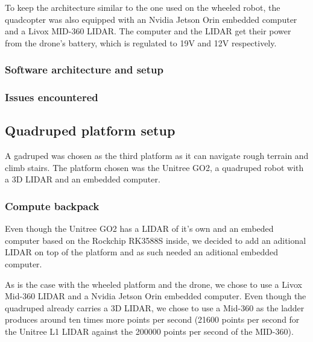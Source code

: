 \documentclass[11pt]{article}
\begin{document}
                To keep the architecture similar to the one used on the wheeled robot, the quadcopter was also equipped with an Nvidia Jetson Orin embedded computer and a Livox MID-360 LIDAR. The computer and the LIDAR get their power from the drone's battery, which is regulated to 19V and 12V respectively.

            \subsubsection{Software architecture and setup}
                
        
            \subsubsection{Issues encountered}
            
    \subsection{Quadruped platform setup}

        A gadruped was chosen as the third platform as it can navigate rough terrain and climb stairs. The platform chosen was the Unitree GO2, a quadruped robot with a 3D LIDAR and an embedded computer.

        \subsubsection{Compute backpack}

        Even though the Unitree GO2 has a LIDAR of it's own and an embeded computer based on the Rockchip RK3588S inside, we decided to add an aditional LIDAR on top of the platform and as such needed an aditional embedded computer.

        As is the case with the wheeled platform and the drone, we chose to use a Livox Mid-360 LIDAR and a Nvidia Jetson Orin embedded computer. Even though the quadruped already carries a 3D LIDAR, we chose to use a Mid-360 as the ladder produces around ten times more points per second (21600 points per second for the Unitree L1 LIDAR against the 200000 points per second of the MID-360).
\end{document}
